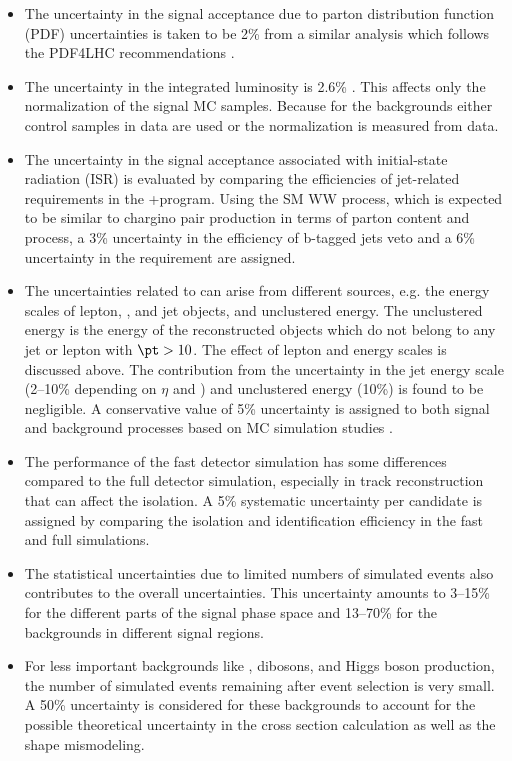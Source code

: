 \begin{itemize}
\item The uncertainty in the signal acceptance due to parton distribution function (PDF) uncertainties
  is taken to be 2\% from a similar analysis \cite{Khachatryan:2014qwa} which follows the PDF4LHC recommendations \cite{pdf4lhc}.

\item The uncertainty in the integrated luminosity  is 2.6\% \cite{CMS-PAS-LUM-13-001}.  This affects only the
  normalization of the signal MC samples. Because for the backgrounds  either control samples in data are used or the normalization is measured from data.

\item The uncertainty in the signal acceptance associated with initial-state radiation (ISR)
is evaluated by comparing the efficiencies of jet-related requirements
in the \MADGRAPH{}+\PYTHIA program.
Using the SM WW process, which
 is expected to be similar to chargino pair production in terms of parton content and process, a 3\% uncertainty in
the efficiency of  b-tagged jets veto and a 6\% uncertainty in the \deltaphi requirement are assigned.

\item The uncertainties related to \MPT can arise from different sources, e.g.  the energy scales of lepton, \Tau, and jet
objects, and unclustered energy.  The unclustered energy is the energy of the reconstructed objects which
 do not belong to any jet or lepton with $\pt > 10$\GeV. The effect of lepton and \Tau
 energy scales is discussed above. The contribution from the uncertainty in the jet energy scale (2--10\% depending on $\eta$  and \pt) and
 unclustered energy (10\%) is found to be negligible. A conservative value of 5\% uncertainty
 is assigned to both signal and background processes based on MC simulation studies \cite{Khachatryan:2015kxa, Khachatryan:2014qwa}.

\item The performance of the fast detector simulation has some differences compared to the full detector simulation, especially in
 track reconstruction \cite{Khachatryan:2015kxa} that can affect the \Tau isolation. A 5\% systematic uncertainty per
 \Tau candidate is assigned by comparing the \Tau isolation and identification efficiency in the fast
 and full simulations.

\item The statistical uncertainties due to limited numbers of simulated events also contributes to the overall uncertainties.
This uncertainty amounts to 3--15\% for the different parts of the signal phase space and 13--70\% for the backgrounds in different signal regions.

\item For less important backgrounds like \ttbar,  dibosons, and Higgs boson production, the number of simulated
events remaining after event selection is very small. A 50\% uncertainty is considered for these backgrounds
to account for the possible theoretical uncertainty in the cross section calculation as well as the shape mismodeling.
\end{itemize}

